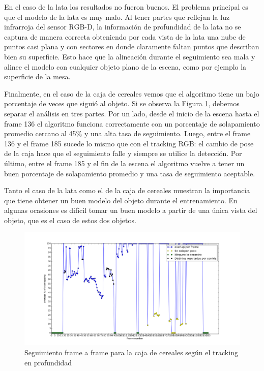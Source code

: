 En el caso de la lata los resultados no fueron buenos. El problema principal es que el modelo de la lata es muy malo. Al tener partes que reflejan la luz infrarroja del sensor RGB-D, la información de profundidad de la lata no se captura de manera correcta obteniendo por cada vista de la lata una nube de puntos casi plana y con sectores en donde claramente faltan puntos que describan bien su superficie. Esto hace que la alineación durante el seguimiento sea mala y alinee el modelo con cualquier objeto plano de la escena, como por ejemplo la superficie de la mesa.

Finalmente, en el caso de la caja de cereales vemos que el algoritmo tiene un bajo porcentaje de veces que siguió al objeto. Si se observa la Figura \ref{frame_frame_d_nuevo}, debemos separar el análisis en tres partes. Por un lado, desde el inicio de la escena hasta el frame 136 el algoritmo funciona correctamente con un porcentaje de solapamiento promedio cercano al 45\% y una alta tasa de seguimiento. Luego, entre el frame 136 y el frame 185 sucede lo mismo que con el tracking RGB: el cambio de pose de la caja hace que el seguimiento falle y siempre se utilice la detección. Por último, entre el frame 185 y el fin de la escena el algoritmo vuelve a tener un buen porcentaje de solapamiento promedio y una tasa de seguimiento aceptable.

Tanto el caso de la lata como el de la caja de cereales muestran la importancia que tiene obtener un buen modelo del objeto durante el entrenamiento. En algunas ocasiones es difícil tomar un buen modelo a partir de una única vista del objeto, que es el caso de estos dos objetos.

\begin{figure}
	\centering
	\includegraphics[width=\textwidth]{img/frame_a_frame/depth-caja.png}
	\caption{Seguimiento frame a frame para la caja de cereales según el tracking en profundidad}
	\label{frame_frame_d_nuevo}
\end{figure}


